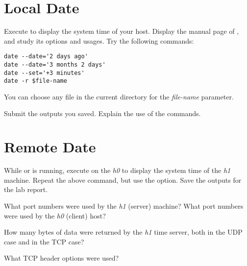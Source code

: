 \documentclass{../UTNetLab}
\begin{document}
\section{Local Date}
Execute  to display the system time of your host.
Display the manual page of , and study its options and usages.
Try the following  commands:

\begin{lstlisting}[emph={$file-name}]
date --date='2 days ago'
date --date='3 months 2 days'
date --set='+3 minutes'
date -r $file-name
    \end{lstlisting}
You can choose any file in the current directory for the \textit{file-name} parameter.

\begin{report}
    \item Submit the  outputs you saved.
    Explain the use of the commands.
\end{report}

\section{Remote Date}
While  or  is running, execute  on the \textit{h0} to display the system time of the \textit{h1} machine.
Repeat the above  command, but use the  option.
Save the  outputs for the lab report.

\begin{report}
    \item What port numbers were used by the \textit{h1} (server) machine?
    What port numbers were used by the \textit{h0} (client) host?

    \item How many bytes of data were returned by the \textit{h1} time server, both in the UDP case and in the TCP case?

    \item What TCP header options were used?
\end{report}
\end{document}
